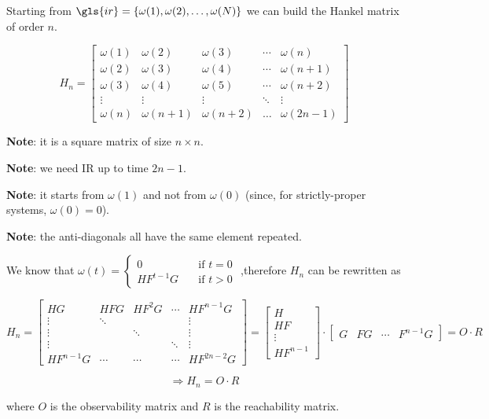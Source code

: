 \begin{definition}
    Starting from $\gls{ir} = \{\omega(1), \omega(2), \ldots, \omega(N)\}$ we can build the Hankel matrix of order $n$.

\[
    H_n = \begin{bmatrix}
        \omega(1) & \omega(2) & \omega(3) & \cdots & \omega(n) \\
        \omega(2) & \omega(3) & \omega(4) & \cdots & \omega(n+1) \\
        \omega(3) & \omega(4) & \omega(5) & \cdots & \omega(n+2) \\
        \vdots    & \vdots    & \vdots    & \ddots & \vdots \\
        \omega(n) & \omega(n+1) & \omega(n+2) & \ldots & \omega(2n-1)
    \end{bmatrix}
\]

    \textbf{Note}: it is a square matrix of size $n\times n$.

    \textbf{Note}: we need IR up to time $2n-1$.

    \textbf{Note}: it starts from $\omega(1)$ and not from $\omega(0)$ (since, for strictly-proper systems, $\omega(0)=0$).

    \textbf{Note}: the anti-diagonals all have the same element repeated.
    
    We know that $\omega(t) = \begin{cases}
    0 &\quad \text{if } t = 0 \\
    HF^{t-1}G &\quad \text{if } t > 0
    \end{cases}$ ,\qquad therefore $H_n$ can be rewritten as

    \[
        H_n = \begin{bmatrix}
            HG     & HFG    & HF^2G  & \cdots & HF^{n-1}G \\
            \vdots & \ddots &        &        & \vdots \\
            \vdots &        & \ddots &        & \vdots \\
            \vdots &        &        & \ddots & \vdots \\
            HF^{n-1}G & \cdots & \cdots & \cdots & HF^{2n-2}G
        \end{bmatrix} = \begin{bmatrix}
            H \\
            HF \\
            \vdots \\
            HF^{n-1}
        \end{bmatrix} \cdot \begin{bmatrix}
            G & FG & \cdots & F^{n-1}G
        \end{bmatrix} = O \cdot R
    \]
    
    \[
        \Rightarrow H_n = O \cdot R
    \]
    
    where $O$ is the observability matrix and $R$ is the reachability matrix.
\end{definition}




